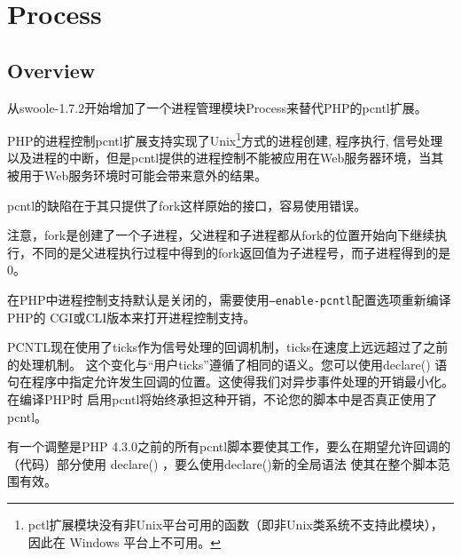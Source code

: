 \part{Process}


\chapter{Overview}


从swoole-1.7.2开始增加了一个进程管理模块Process来替代PHP的pcntl扩展。

PHP的进程控制pcntl扩展支持实现了Unix\footnote{pctl扩展模块没有非Unix平台可用的函数（即非Unix类系统不支持此模块），因此在 Windows 平台上不可用。}方式的进程创建, 程序执行, 信号处理以及进程的中断，但是pcntl提供的进程控制不能被应用在Web服务器环境，当其被用于Web服务环境时可能会带来意外的结果。

pcntl的缺陷在于其只提供了fork这样原始的接口，容易使用错误。

注意，fork是创建了一个子进程，父进程和子进程都从fork的位置开始向下继续执行，不同的是父进程执行过程中得到的fork返回值为子进程号，而子进程得到的是0。

在PHP中进程控制支持默认是关闭的，需要使用\texttt{--enable-pcntl}配置选项重新编译PHP的 CGI或CLI版本来打开进程控制支持。

PCNTL现在使用了ticks作为信号处理的回调机制，ticks在速度上远远超过了之前的处理机制。 这个变化与“用户ticks”遵循了相同的语义。您可以使用declare() 语句在程序中指定允许发生回调的位置。这使得我们对异步事件处理的开销最小化。在编译PHP时 启用pcntl将始终承担这种开销，不论您的脚本中是否真正使用了pcntl。

有一个调整是PHP 4.3.0之前的所有pcntl脚本要使其工作，要么在期望允许回调的（代码）部分使用 declare() ，要么使用declare()新的全局语法 使其在整个脚本范围有效。


